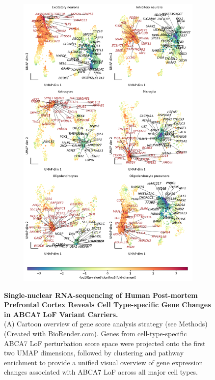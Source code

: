 \begin{figure}[ht]
    \begin{subfigure}[t]{0.7\textwidth}
        \caption{}
        \includegraphics[width=\textwidth]{./extended_plots/umap_projection_more_genes.png}        
    \end{subfigure}    
    \caption{
        \textbf{Single-nuclear RNA-sequencing of Human Post-mortem Prefrontal Cortex Reveals Cell Type-specific Gene Changes in ABCA7 LoF Variant Carriers.}\\[1ex]
        (A) Cartoon overview of gene score analysis strategy (see Methods) (Created with BioRender.com). Genes from cell-type-specific ABCA7 LoF perturbation score space were projected onto the first two UMAP dimensions, followed by clustering and pathway enrichment to provide a unified visual overview of gene expression changes associated with ABCA7 LoF across all major cell types. 
}
\end{figure}
